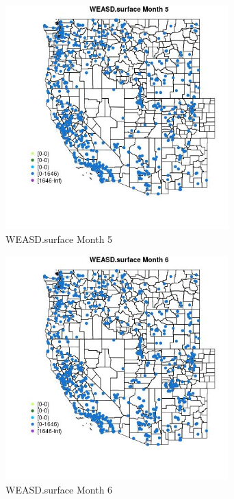 \begin{figure} 
\centering  
\includegraphics[width=0.77\textwidth]{Code_Outputs/Report_ML_input_PM25_Step4_part_e_de_duplicated_aves_compiled_2019-05-21wNAs_MapObsMo5WEASDsurface.jpg} 
\caption{\label{fig:Report_ML_input_PM25_Step4_part_e_de_duplicated_aves_compiled_2019-05-21wNAsMapObsMo5WEASDsurface}WEASD.surface Month 5} 
\end{figure} 
 

\begin{figure} 
\centering  
\includegraphics[width=0.77\textwidth]{Code_Outputs/Report_ML_input_PM25_Step4_part_e_de_duplicated_aves_compiled_2019-05-21wNAs_MapObsMo6WEASDsurface.jpg} 
\caption{\label{fig:Report_ML_input_PM25_Step4_part_e_de_duplicated_aves_compiled_2019-05-21wNAsMapObsMo6WEASDsurface}WEASD.surface Month 6} 
\end{figure} 
 

